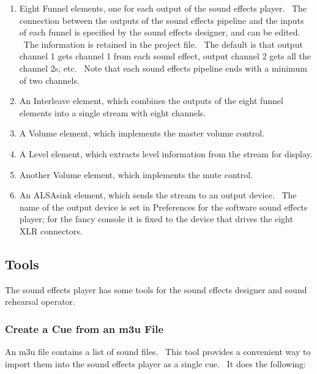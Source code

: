 \documentclass[letterpaper]{article}
\newcommand\liststyleLxix{%
\renewcommand\theenumi{\arabic{enumi}}
\renewcommand\theenumii{\arabic{enumii}}
\renewcommand\theenumiii{\arabic{enumiii}}
\renewcommand\theenumiv{\arabic{enumiv}}
\renewcommand\labelenumi{\theenumi.}
\renewcommand\labelenumii{\theenumii.}
\renewcommand\labelenumiii{\theenumiii.}
\renewcommand\labelenumiv{\theenumiv.}
}
\begin{document}
\liststyleLxix
\begin{enumerate}
\item Eight Funnel elements, one for each output of the sound effects
player. \ The connection between the outputs of the sound effects
pipeline and the inputs of each funnel is specified by the sound
effects designer, and can be edited. \ The information is retained in
the project file. \ The default is that output channel 1 gets channel 1
from each sound effect, output channel 2 gets all the channel 2s, etc.
\ Note that each sound effects pipeline ends with a minimum of two
channels.
\item An Interleave element, which combines the outputs of the eight
funnel elements into a single stream with eight channels.
\item A Volume element, which implements the master volume control.
\item A Level element, which extracts level information from the stream
for display.
\item Another Volume element, which implements the mute control.
\item An ALSAsink element, which sends the stream to an output device.
\ The name of the output device is set in Preferences for the software
sound effects player; for the fancy console it is fixed to the device
that drives the eight XLR connectors.
\end{enumerate}
\subsection[Tools]{Tools}
The sound effects player has some tools for the sound effects designer
and sound rehearsal operator.

\subsubsection[Create a Cue from an m3u File]{Create a Cue from an m3u
File}
An m3u file contains a list of sound files. \ This tool provides a
convenient way to import them into the sound effects player as a single
cue. \ It does the following:
\end{document}

